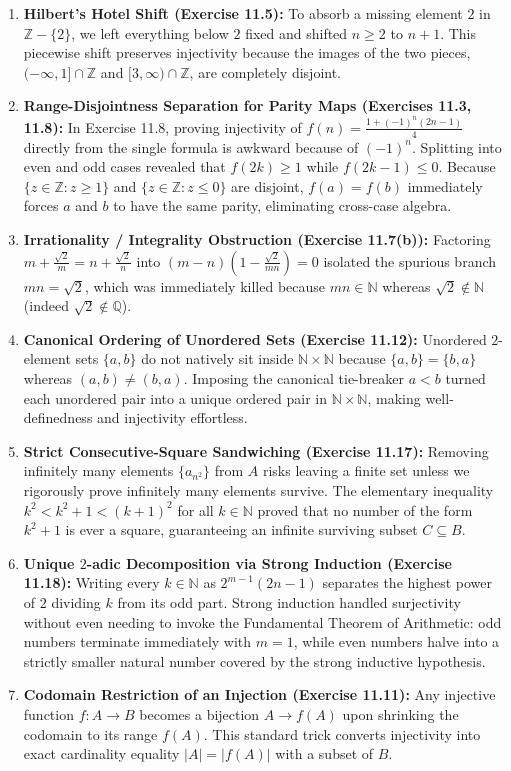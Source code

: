 \documentclass[11pt, letterpaper]{article}
\theoremstyle{definition}
\theoremstyle{remark}
\begin{document}
\begin{enumerate}[label=\textbf{\arabic*.}]
    \item \textbf{Hilbert's Hotel Shift (Exercise 11.5):} To absorb a missing element $2$ in $\mathbb{Z} - \{2\}$, we left everything below $2$ fixed and shifted $n \ge 2$ to $n + 1$. This piecewise shift preserves injectivity because the images of the two pieces, $(-\infty, 1] \cap \mathbb{Z}$ and $[3, \infty) \cap \mathbb{Z}$, are completely disjoint.
    \item \textbf{Range-Disjointness Separation for Parity Maps (Exercises 11.3, 11.8):} In Exercise 11.8, proving injectivity of $f(n) = \frac{1 + (-1)^n(2n-1)}{4}$ directly from the single formula is awkward because of $(-1)^n$. Splitting into even and odd cases revealed that $f(2k) \ge 1$ while $f(2k-1) \le 0$. Because $\{z \in \mathbb{Z} : z \ge 1\}$ and $\{z \in \mathbb{Z} : z \le 0\}$ are disjoint, $f(a) = f(b)$ immediately forces $a$ and $b$ to have the same parity, eliminating cross-case algebra.
    \item \textbf{Irrationality / Integrality Obstruction (Exercise 11.7(b)):} Factoring $m + \frac{\sqrt{2}}{m} = n + \frac{\sqrt{2}}{n}$ into $(m - n)\left(1 - \frac{\sqrt{2}}{mn}\right) = 0$ isolated the spurious branch $mn = \sqrt{2}$, which was immediately killed because $mn \in \mathbb{N}$ whereas $\sqrt{2} \notin \mathbb{N}$ (indeed $\sqrt{2} \notin \mathbb{Q}$).
    \item \textbf{Canonical Ordering of Unordered Sets (Exercise 11.12):} Unordered $2$-element sets $\{a, b\}$ do not natively sit inside $\mathbb{N} \times \mathbb{N}$ because $\{a, b\} = \{b, a\}$ whereas $(a, b) \neq (b, a)$. Imposing the canonical tie-breaker $a < b$ turned each unordered pair into a unique ordered pair in $\mathbb{N} \times \mathbb{N}$, making well-definedness and injectivity effortless.
    \item \textbf{Strict Consecutive-Square Sandwiching (Exercise 11.17):} Removing infinitely many elements $\{a_{n^2}\}$ from $A$ risks leaving a finite set unless we rigorously prove infinitely many elements survive. The elementary inequality $k^2 < k^2 + 1 < (k+1)^2$ for all $k \in \mathbb{N}$ proved that no number of the form $k^2 + 1$ is ever a square, guaranteeing an infinite surviving subset $C \subseteq B$.
    \item \textbf{Unique $2$-adic Decomposition via Strong Induction (Exercise 11.18):} Writing every $k \in \mathbb{N}$ as $2^{m-1}(2n - 1)$ separates the highest power of $2$ dividing $k$ from its odd part. Strong induction handled surjectivity without even needing to invoke the Fundamental Theorem of Arithmetic: odd numbers terminate immediately with $m = 1$, while even numbers halve into a strictly smaller natural number covered by the strong inductive hypothesis.
    \item \textbf{Codomain Restriction of an Injection (Exercise 11.11):} Any injective function $f : A \to B$ becomes a bijection $A \to f(A)$ upon shrinking the codomain to its range $f(A)$. This standard trick converts injectivity into exact cardinality equality $|A| = |f(A)|$ with a subset of $B$.
\end{enumerate}
\end{document}
